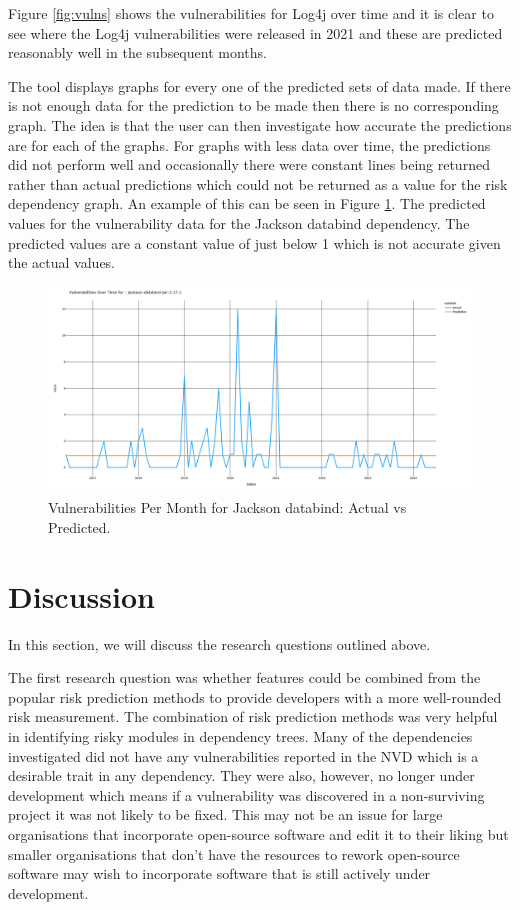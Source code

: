\documentclass[conference]{IEEEtran}
\begin{document}
Figure \ref{fig:vulns} shows the vulnerabilities for Log4j over time and it is clear to see where the Log4j vulnerabilities were released in 2021 and these are predicted reasonably well in the subsequent months. 

The tool displays graphs for every one of the predicted sets of data made. If there is not enough data for the prediction to be made then there is no corresponding graph. The idea is that the user can then investigate how accurate the predictions are for each of the graphs. For graphs with less data over time, the predictions did not perform well and occasionally there were constant lines being returned rather than actual predictions which could not be returned as a value for the risk dependency graph. An example of this can be seen in Figure \ref{fig:const}. The predicted values for the vulnerability data for the Jackson databind dependency. The predicted values are a constant value of just below 1 which is not accurate given the actual values. 

\begin{figure}
    \centering
    \includegraphics[width=1\linewidth]{Const.png}
    \caption{Vulnerabilities Per Month for Jackson databind: Actual vs Predicted.} 
    \label{fig:const}
\end{figure}

\section{Discussion}
In this section, we will discuss the research questions outlined above. 

The first research question was whether features could be combined from the popular risk prediction methods to provide developers with a more well-rounded risk measurement. The combination of risk prediction methods was very helpful in identifying risky modules in dependency trees. Many of the dependencies investigated did not have any vulnerabilities reported in the NVD which is a desirable trait in any dependency. They were also, however, no longer under development which means if a vulnerability was discovered in a non-surviving project it was not likely to be fixed. This may not be an issue for large organisations that incorporate open-source software and edit it to their liking but smaller organisations that don't have the resources to rework open-source software may wish to incorporate software that is still actively under development.
\end{document}
